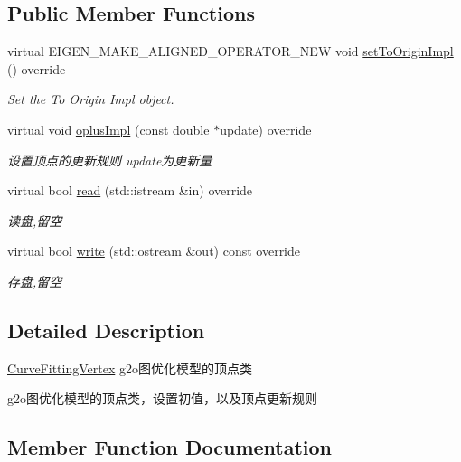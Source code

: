 \subsection*{Public Member Functions}
\begin{DoxyCompactItemize}
\item 
virtual E\+I\+G\+E\+N\+\_\+\+M\+A\+K\+E\+\_\+\+A\+L\+I\+G\+N\+E\+D\+\_\+\+O\+P\+E\+R\+A\+T\+O\+R\+\_\+\+N\+EW void \hyperlink{classCurveFittingVertex_a47ac379f177a871d1352c1c9dc64fa16}{set\+To\+Origin\+Impl} () override
\begin{DoxyCompactList}\small\item\em Set the To Origin Impl object. \end{DoxyCompactList}\item 
virtual void \hyperlink{classCurveFittingVertex_a4e384a35c5f108f2ca7fbcad204c4df3}{oplus\+Impl} (const double $\ast$update) override
\begin{DoxyCompactList}\small\item\em 设置顶点的更新规则 update为更新量 \end{DoxyCompactList}\item 
virtual bool \hyperlink{classCurveFittingVertex_aa96dd0a2d3d3bfe757484c912dd0f27b}{read} (std\+::istream \&in) override
\begin{DoxyCompactList}\small\item\em 读盘,留空 \end{DoxyCompactList}\item 
virtual bool \hyperlink{classCurveFittingVertex_aa1443355babb211e227422ea0675dc32}{write} (std\+::ostream \&out) const override
\begin{DoxyCompactList}\small\item\em 存盘,留空 \end{DoxyCompactList}\end{DoxyCompactItemize}


\subsection{Detailed Description}
\hyperlink{classCurveFittingVertex}{Curve\+Fitting\+Vertex} g2o图优化模型的顶点类 

g2o图优化模型的顶点类，设置初值，以及顶点更新规则 

\subsection{Member Function Documentation}
